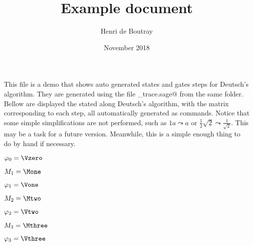 \documentclass{article}
\title{Example document}
\author{Henri de Boutray}
\date{November 2018}
\begin{document}
\maketitle

This file is a demo that shows auto generated states and gates steps for
Deutsch's algorithm. They are generated using the file \verb@deutsch_trace.sage@
from the same folder.  Bellow are displayed the stated along Deutsch's
algorithm, with the matrix corresponding to each step, all automatically
generated as commands. Notice that some simple simplifications are not
performed, such as $1a \leadsto a$ or $\frac{1}{2}\sqrt{2} \leadsto \frac{1}{
\sqrt{2}}$. This may be a task for a future version. Meanwhile, this is a simple
enough thing to do by hand if necessary.

$\varphi_0=\Vzero$

$M_1=\Mone$

$\varphi_1=\Vone$

$M_2=\Mtwo$

$\varphi_2=\Vtwo$

$M_3=\Mthree$

$\varphi_3=\Vthree$
\end{document}
